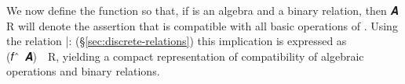 We now define the function  so that, if  is an algebra and  a binary relation, then  \ab 𝑨 \ab R will denote the assertion that  is compatible %
with all basic operations of .
Using the relation |: (\S\ref{sec:discrete-relations}) this implication is expressed as (\ab 𝑓~\af ̂~\ab 𝑨)~\af{|:}~\ab R, yielding a compact representation of compatibility of algebraic operations and binary relations.
\ccpad
\begin{code}%
\>[0][@{}l@{\AgdaIndent{1}}]%
\>[1]\AgdaSpace{}%
\AgdaSymbol{:}\AgdaSpace{}%
\AgdaSymbol{(}\AgdaSpace{}%
\AgdaSymbol{:}\AgdaSpace{}%
\AgdaSpace{}%
\AgdaSpace{}%
\AgdaSymbol{)}\AgdaSpace{}%
\AgdaSpace{}%
\AgdaSpace{}%
\AgdaSpace{}%
\AgdaSpace{}%
\AgdaSpace{}%
\AgdaSpace{}%
\AgdaSpace{}%
\AgdaSpace{}%
\AgdaSpace{}%
\AgdaSpace{}%
\AgdaSpace{}%
\AgdaSpace{}%
\AgdaSpace{}%
\AgdaSpace{}%
\<%
\\
%
\>[1]%
\>[13]\AgdaSpace{}%
\AgdaSpace{}%
\AgdaSymbol{=}\AgdaSpace{}%
\AgdaSpace{}%
\AgdaSpace{}%
\AgdaSpace{}%
\AgdaSymbol{(}\AgdaSpace{}%
\AgdaSpace{}%
\AgdaSymbol{)}\AgdaSpace{}%
\AgdaFunction{|:}\AgdaSpace{}%
\<%
\end{code}

